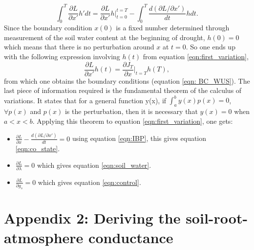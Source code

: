 \documentclass[utf8]{frontiersSCNS} %
\begin{document}
\begin{equation}
    \label{eqn:IBP}
    \int_0^T \frac{\partial L}{\partial x'} h' dt = \frac{\partial L}{\partial x'} h |_{t=0}^{t=T} - \int_0^T \frac{d(\partial L / \partial x')}{dt} h dt.
\end{equation}
Since the boundary condition $x(0)$ is a fixed number determined through measurement of the soil water content at the beginning of drought, $h(0)=0$ which means that there is no perturbation around $x$ at $t=0$. So one ends up with the following expression involving $h(t)$ from equation \ref{eqn:first_variation},
\begin{equation}
    \frac{\partial L}{\partial x'} h(t) = \frac{\partial J_T}{\partial x}|_{t=T} h(T),
\end{equation}
from which one obtains the boundary conditions (equation \ref{eqn: BC_WUS}). The last piece of information required is the fundamental theorem of the calculus of variations. It states that for a general function y(x), if $\int_a^b y(x)p(x) = 0$, $\forall p(x)$ and $p(x)$ is the perturbation, then it is necessary that $y(x)=0$ when $a<x<b$. Applying this theorem to equation \ref{eqn:first_variation}, one gets:
\begin{itemize}
    \item $\frac{\partial L}{\partial x} - \frac{d(\partial L / \partial x')}{dt} = 0$ using equation \ref{eqn:IBP}, this gives equation \ref{eqn:co_state}.
    \item  $\frac{\partial L}{\partial \lambda} = 0$ which gives equation \ref{eqn:soil_water}.
    \item  $\frac{\partial L}{\partial g_s} = 0$ which gives equation \ref{eqn:control}.
\end{itemize}

\section*{Appendix 2: Deriving the soil-root-atmosphere conductance}
\end{document}
